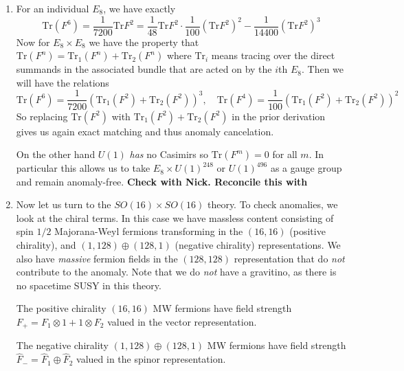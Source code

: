 \documentclass[11pt, class=article, crop=false]{standalone}
\begin{document}
\begin{enumerate}
	\item For an individual $E_8$, we have exactly
	\[
		\mathrm{Tr}(F^6) = \frac{1}{7200} \mathrm{Tr}{F^2} = \frac{1}{48} \mathrm{Tr}{F^2} \cdot \frac{1}{100} (\mathrm{Tr}{F^2})^2 - \frac{1}{14400} (\mathrm{Tr}{F^2})^3
	\]
	Now for $E_8 \times E_8$ we have the property that $\mathrm{Tr}(F^n) = \mathrm{Tr}_1(F^n) + \mathrm{Tr}_2(F^n)$ where $\mathrm{Tr}_i$ means tracing over the direct summands in the associated bundle that are acted on by the $i$th $E_8$. Then we will have the relations
	\[
		\mathrm{Tr}(F^6) = \frac{1}{7200} (\mathrm{Tr}_1(F^2) + \mathrm{Tr}_2(F^2))^3, \quad \mathrm{Tr}(F^4) = \frac{1}{100} (\mathrm{Tr}_1(F^2) + \mathrm{Tr}_2(F^2))^2
	\]
	So replacing $\mathrm{Tr}(F^2)$ with $\mathrm{Tr}_1(F^2) + \mathrm{Tr}_2(F^2)$ in the prior derivation gives us again exact matching and thus anomaly cancelation. 
	
	On the other hand $U(1)$ \emph{has} no Casimirs so $\mathrm{Tr}(F^m) = 0$ for all $m$. In particular this allows us to take $E_8 \times U(1)^{248}$ or $U(1)^{496}$ as a gauge group and remain anomaly-free. \textbf{Check with Nick. Reconcile this with} 
	
	\item Now let us turn to the $SO(16) \times SO(16)$ theory. To check anomalies, we look at the chiral terms. In this case we have massless content consisting of spin $1/2$ Majorana-Weyl fermions transforming in the $(16,16)$ (positive chirality), and $(1, 128) \oplus (128, 1)$ (negative chirality) representations. We also have \emph{massive} fermion fields in the $(128,128)$ representation that do \emph{not} contribute to the anomaly. Note that we do \emph{not} have a gravitino, as there is no spacetime SUSY in this theory.
	
	The positive chirality $(16,16)$ MW fermions have field strength $F_+ = F_1 \otimes 1 + 1 \otimes F_2$ valued in the vector representation. 
	
	The negative chirality $(1, 128) \oplus (128, 1)$ MW fermions have field strength $\hat F_- = \hat F_1 \oplus \hat F_2$ valued in the spinor representation. 


\end{enumerate}
\end{document}
